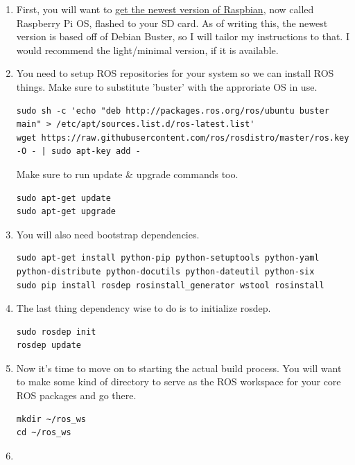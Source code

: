 \documentclass[11pt]{article}
\begin{document}
\begin{enumerate}
    \item First, you will want to \href{https://www.raspberrypi.org/downloads/raspberry-pi-os/}{get the newest version of Raspbian}, now called Raspberry Pi OS, flashed to your SD card. As of writing this, the newest version is based off of Debian Buster, so I will tailor my instructions to that. I would recommend the light/minimal version, if it is available.
    
    \item You need to setup ROS repositories for your system so we can install ROS things. Make sure to substitute 'buster' with the approriate OS in use.
    \begin{verbatim}
sudo sh -c 'echo "deb http://packages.ros.org/ros/ubuntu buster main" > /etc/apt/sources.list.d/ros-latest.list'
wget https://raw.githubusercontent.com/ros/rosdistro/master/ros.key -O - | sudo apt-key add -
    \end{verbatim}
    
    Make sure to run update \& upgrade commands too.
    
    \begin{verbatim}
sudo apt-get update
sudo apt-get upgrade
    \end{verbatim}
    
    \item You will also need bootstrap dependencies.
    \begin{verbatim}
sudo apt-get install python-pip python-setuptools python-yaml python-distribute python-docutils python-dateutil python-six
sudo pip install rosdep rosinstall_generator wstool rosinstall
    \end{verbatim}
    
    \item The last thing dependency wise to do is to initialize rosdep.
    \begin{verbatim}
sudo rosdep init
rosdep update
    \end{verbatim}
    
    \item Now it's time to move on to starting the actual build process. You will want to make some kind of directory to serve as the ROS workspace for your core ROS packages and go there.
    \begin{verbatim}
mkdir ~/ros_ws
cd ~/ros_ws
    \end{verbatim}
    
    \item 
    
    
\end{enumerate}
\end{document}
